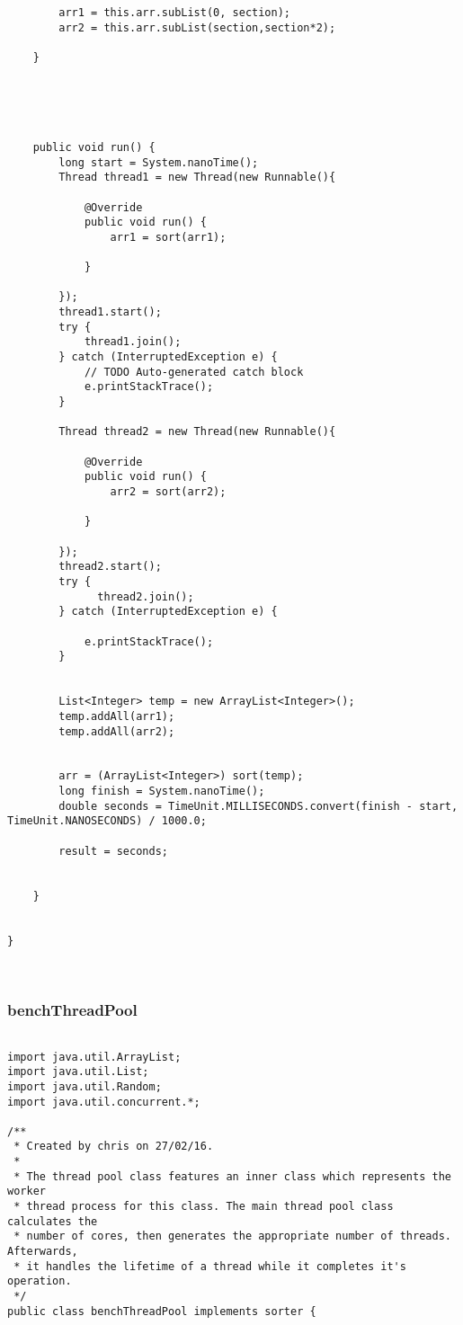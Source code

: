 \documentclass[11pt]{article}  %
\theoremstyle{definition}
\theoremstyle{remark}
\begin{document}
\begin{appendices}
\begin{lstlisting}
        arr1 = this.arr.subList(0, section);
        arr2 = this.arr.subList(section,section*2);

    }





    public void run() {
        long start = System.nanoTime();
        Thread thread1 = new Thread(new Runnable(){

            @Override
            public void run() {
                arr1 = sort(arr1);

            }

        });
        thread1.start();
        try {
            thread1.join();
        } catch (InterruptedException e) {
            // TODO Auto-generated catch block
            e.printStackTrace();
        }

        Thread thread2 = new Thread(new Runnable(){

            @Override
            public void run() {
                arr2 = sort(arr2);

            }

        });
        thread2.start();
        try {
              thread2.join();
        } catch (InterruptedException e) {

            e.printStackTrace();
        }


        List<Integer> temp = new ArrayList<Integer>();
        temp.addAll(arr1);
        temp.addAll(arr2);


        arr = (ArrayList<Integer>) sort(temp);
        long finish = System.nanoTime();
        double seconds = TimeUnit.MILLISECONDS.convert(finish - start, TimeUnit.NANOSECONDS) / 1000.0;

        result = seconds;


    }


}



\end{lstlisting}
 
\newpage
\subsubsection{benchThreadPool}\label{1} 
  \begin{lstlisting}

import java.util.ArrayList;
import java.util.List;
import java.util.Random;
import java.util.concurrent.*;

/**
 * Created by chris on 27/02/16.
 *
 * The thread pool class features an inner class which represents the worker
 * thread process for this class. The main thread pool class calculates the
 * number of cores, then generates the appropriate number of threads. Afterwards,
 * it handles the lifetime of a thread while it completes it's operation.
 */
public class benchThreadPool implements sorter {


\end{lstlisting}
\end{appendices}
\end{document}
